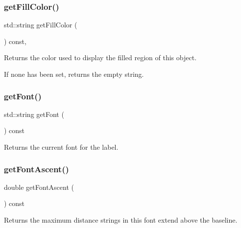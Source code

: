 \subsubsection{\texorpdfstring{get\+Fill\+Color()}{getFillColor()}}
{\footnotesize\ttfamily std\+::string get\+Fill\+Color (\begin{DoxyParamCaption}{ }\end{DoxyParamCaption}) const\hspace{0.3cm}{\ttfamily [virtual]}, {\ttfamily [inherited]}}



Returns the color used to display the filled region of this object. 

If none has been set, returns the empty string. \mbox{\label{classsgl_1_1GText_a894a5502900794eeb27d084c21f1d77d}} 
\subsubsection{\texorpdfstring{get\+Font()}{getFont()}}
{\footnotesize\ttfamily std\+::string get\+Font (\begin{DoxyParamCaption}{ }\end{DoxyParamCaption}) const\hspace{0.3cm}{\ttfamily [virtual]}}



Returns the current font for the label. 

\mbox{\label{classsgl_1_1GText_ab7583914978530e097034293e9d316ad}} 
\subsubsection{\texorpdfstring{get\+Font\+Ascent()}{getFontAscent()}}
{\footnotesize\ttfamily double get\+Font\+Ascent (\begin{DoxyParamCaption}{ }\end{DoxyParamCaption}) const\hspace{0.3cm}{\ttfamily [virtual]}}



Returns the maximum distance strings in this font extend above the baseline. 


